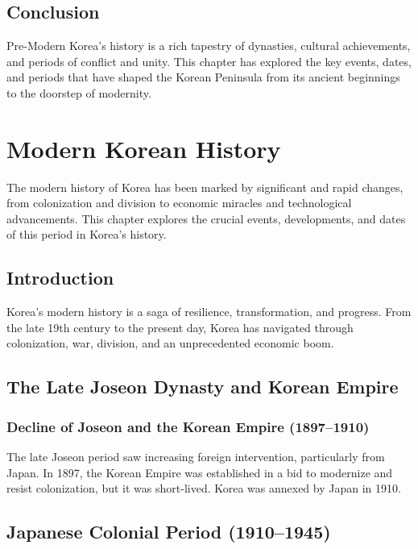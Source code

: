 \documentclass[a4paper,12pt]{book}
\begin{document}
\section{Conclusion}
\label{sec:conclusion-pre-modern-korea}
Pre-Modern Korea's history is a rich tapestry of dynasties, cultural achievements, and periods of conflict and unity. This chapter has explored the key events, dates, and periods that have shaped the Korean Peninsula from its ancient beginnings to the doorstep of modernity.

\chapter{Modern Korean History}
\label{ch:modern-korean-history}

The modern history of Korea has been marked by significant and rapid changes, from colonization and division to economic miracles and technological advancements. This chapter explores the crucial events, developments, and dates of this period in Korea’s history.

\section{Introduction}
\label{sec:introduction-modern-korea}
Korea’s modern history is a saga of resilience, transformation, and progress. From the late 19th century to the present day, Korea has navigated through colonization, war, division, and an unprecedented economic boom.

\section{The Late Joseon Dynasty and Korean Empire}
\label{sec:late-joseon-korean-empire}

\subsection{Decline of Joseon and the Korean Empire (1897–1910)}
\label{subsec:decline-joseon-korean-empire}
The late Joseon period saw increasing foreign intervention, particularly from Japan. In 1897, the Korean Empire was established in a bid to modernize and resist colonization, but it was short-lived. Korea was annexed by Japan in 1910.

\section{Japanese Colonial Period (1910–1945)}
\label{sec:japanese-colonial-period}
\end{document}
